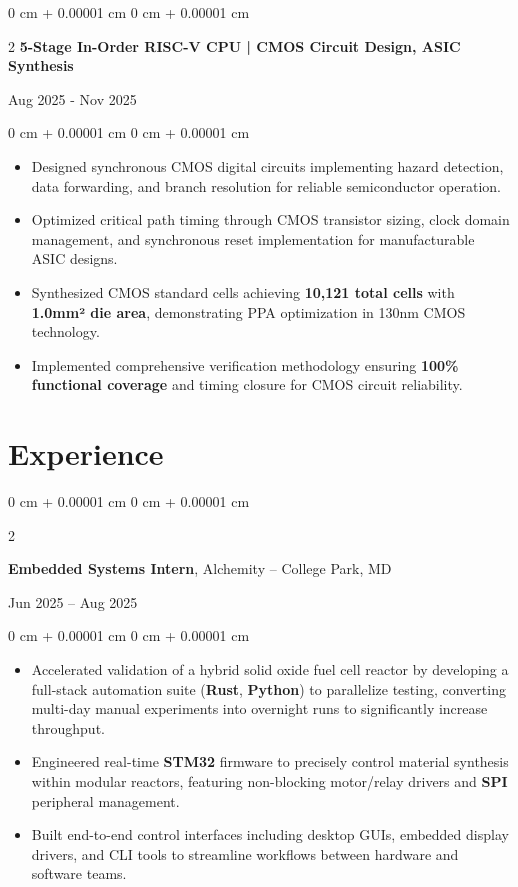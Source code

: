 \documentclass[10pt, letterpaper]{article}
\newenvironment{highlights}{
    \begin{itemize}[
        topsep=0.05 cm,
        parsep=0.05 cm,
        partopsep=0pt,
        itemsep=0pt,
        leftmargin=0 cm + 10pt
    ]
}{
    \end{itemize}
}
\newenvironment{onecolentry}{
    \begin{adjustwidth}{
        0 cm + 0.00001 cm
    }{
        0 cm + 0.00001 cm
    }
}{
    \end{adjustwidth}
}
\newenvironment{twocolentry}[2][]{
    \onecolentry
    \def\secondColumn{#2}
    \setcolumnwidth{\fill, 4.5 cm}
    \begin{paracol}{2}
}{
    \switchcolumn \raggedleft \secondColumn
    \end{paracol}
    \endonecolentry
}
\begin{document}
        \vspace{0.10 cm}
        \begin{twocolentry}{
            Aug 2025 - Nov 2025 } \textbf{5-Stage In-Order RISC-V CPU | CMOS Circuit Design, ASIC Synthesis}
        \end{twocolentry}
        \vspace{0.05 cm}
        \begin{onecolentry}
            \begin{highlights}
                \item Designed synchronous CMOS digital circuits implementing hazard detection, data forwarding, and branch resolution for reliable semiconductor operation.
                \item Optimized critical path timing through CMOS transistor sizing, clock domain management, and synchronous reset implementation for manufacturable ASIC designs.
                \item Synthesized CMOS standard cells achieving \textbf{10,121 total cells} with \textbf{1.0mm² die area}, demonstrating PPA optimization in 130nm CMOS technology.
                \item Implemented comprehensive verification methodology ensuring \textbf{100\% functional coverage} and timing closure for CMOS circuit reliability.
            \end{highlights}
        \end{onecolentry}

    \section{Experience}
        
        \begin{twocolentry}{
            Jun 2025 – Aug 2025
        }
            \textbf{Embedded Systems Intern}, Alchemity -- College Park, MD
        \end{twocolentry}
        \vspace{0.05 cm}
        \begin{onecolentry}
            \begin{highlights}
                \item Accelerated validation of a hybrid solid oxide fuel cell reactor by developing a full-stack automation suite (\textbf{Rust}, \textbf{Python}) to parallelize testing, converting multi-day manual experiments into overnight runs to significantly increase throughput.
                \item Engineered real-time \textbf{STM32} firmware to precisely control material synthesis within modular reactors, featuring non-blocking motor/relay drivers and \textbf{SPI} peripheral management.
                \item Built end-to-end control interfaces including desktop GUIs, embedded display drivers, and CLI tools to streamline workflows between hardware and software teams.
            \end{highlights}
        \end{onecolentry}
\end{document}
